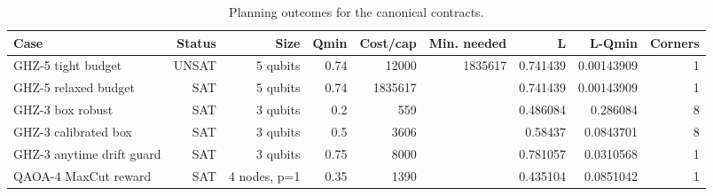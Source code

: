 \begin{table}[t]
\centering
\caption{Planning outcomes for the canonical contracts.}
\label{tab:planning-summary}
\begin{tabular}{lrrrrrrrr}
\hline
Case & Status & Size & Qmin & Cost/cap & Min. needed & L & L-Qmin & Corners \\
\hline
GHZ-5 tight budget & UNSAT & 5 qubits & 0.74 & 12000 & 1835617 & 0.741439 & 0.00143909 & 1 \\
GHZ-5 relaxed budget & SAT & 5 qubits & 0.74 & 1835617 &  & 0.741439 & 0.00143909 & 1 \\
GHZ-3 box robust & SAT & 3 qubits & 0.2 & 559 &  & 0.486084 & 0.286084 & 8 \\
GHZ-3 calibrated box & SAT & 3 qubits & 0.5 & 3606 &  & 0.58437 & 0.0843701 & 8 \\
GHZ-3 anytime drift guard & SAT & 3 qubits & 0.75 & 8000 &  & 0.781057 & 0.0310568 & 1 \\
QAOA-4 MaxCut reward & SAT & 4 nodes, p=1 & 0.35 & 1390 &  & 0.435104 & 0.0851042 & 1 \\
\hline
\end{tabular}
\end{table}
